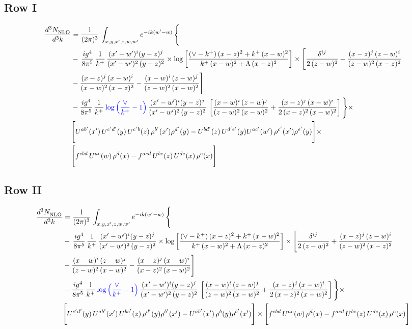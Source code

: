 \documentclass[9pt]{article}
\numberwithin{equation}{section}
\begin{document}
\subsection{Row I}
\begin{align}
     \frac{d^{3}N_{\rm NLO}^{\rm}}{d^{3}k}  & =  \frac{1}{(2\pi)^{3}}\, \int_{x,y,x',z,w,w^{\prime}} e^{-ik(w^{\prime}-w)}\, \Bigg\{\notag \\ & -\,\frac{ig^{4}}{8\pi^{5}}\,\frac{1}{k^{+}}\,\frac{(x'-w')^{i}(y-z)^{j}}{(x'-w')^{2}\,(y-z)^{2}}\times \log{\left[\frac{(\vee-k^{+})\,(x-z)^{2}+k^{+}\,(x-w)^{2}}{k^{+}\,(x-w)^{2}+\Lambda\, (x-z)^{2}}\right]}\times \Bigg[\frac{\delta^{ij}}{2\,(z-w)^{2}}+\frac{(x-z)^{j}\,(z-w)^{i}}{(z-w)^{2}\,(x-z)^{2}}\notag \\ & -\frac{(x-z)^{j}\,(x-w)^{i}}{(x-w)^{2}\,(x-z)^{2}}-\frac{(x-w)^{i}\,(z-w)^{j}}{(z-w)^{2}\,(x-w)^{2}}\Bigg]\notag \\ &  -\frac{ig^{4}}{8\pi^{5}}\,\frac{1}{k^{+}}\,{\color{blue}\log{\left(\frac{\vee}{k^{+}}-1\right)}}\,\frac{(x'-w')^{i}(y-z)^{j}}{(x'-w')^{2}\,(y-z)^{2}}\,\left[\frac{(x-w)^{i}\,(z-w)^{j}}{(z-w)^{2}\,(x-w)^{2}}+\frac{(x-z)^{j}\,(x-w)^{i}}{2\,(x-z)^{2}\, (x-w)^{2}}\right]\Bigg\}\times \notag \\ &  \Bigg[U^{ab'}(x')\,U^{c'd'}(y)\,U^{c'b}(z)\,\rho^{b'}(x')\rho^{d'}(y)-U^{bd'}(z)\,U^{d'e'}(y)U^{ac'}(w')\,\rho^{c'}(x')\rho^{e'}(y)\Bigg]\times\notag \\ & \Bigg[f^{cbd}\,U^{ac}(w)\,\rho^{d}(x)-f^{acd}\, U^{bc}(z)\,U^{de}(x)\,\rho^{e}(x)\Bigg] 
\end{align}
\subsection{Row II}
\begin{align}
     \frac{d^{3}N_{\rm NLO}^{\rm}}{d^{3}k}  & =  \frac{1}{(2\pi)^{3}}\, \int_{x,y,x',z,w,w^{\prime}} e^{-ik(w^{\prime}-w)}\, \Bigg\{\notag \\ & -\,\frac{ig^{4}}{8\pi^{5}}\,\frac{1}{k^{+}}\,\frac{(x'-w')^{i}(y-z)^{j}}{(x'-w')^{2}\,(y-z)^{2}}\times \log{\left[\frac{(\vee-k^{+})\,(x-z)^{2}+k^{+}\,(x-w)^{2}}{k^{+}\,(x-w)^{2}+\Lambda\, (x-z)^{2}}\right]}\times \Bigg[\frac{\delta^{ij}}{2\,(z-w)^{2}}+\frac{(x-z)^{j}\,(z-w)^{i}}{(z-w)^{2}\,(x-z)^{2}}\notag \\ & -\frac{(x-w)^{i}\,(z-w)^{j}}{(z-w)^{2}\,(x-w)^{2}}-\frac{(x-z)^{j}\,(x-w)^{i}}{(x-z)^{2}\,(x-w)^{2}}\Bigg]\notag \\ &  -\frac{ig^{4}}{8\pi^{5}}\,\frac{1}{k^{+}}\,{\color{blue}\log{\left(\frac{\vee}{k^{+}}-1\right)}}\,\frac{(x'-w')^{i}(y-z)^{j}}{(x'-w')^{2}\,(y-z)^{2}}\,\left[\frac{(x-w)^{i}\,(z-w)^{j}}{(z-w)^{2}\,(x-w)^{2}}+\frac{(x-z)^{j}\,(x-w)^{i}}{2\,(x-z)^{2}\, (x-w)^{2}}\right]\Bigg\}\times \notag \\ & \Bigg[U^{c'd'}(y)\,U^{ab'}(x')\,U^{bc'}(z)\,\rho^{d'}(y)\rho^{b'}(x')-U^{ab'}(x')\,\rho^{b}(y)\rho^{b'}(x')\Bigg]\times\Bigg[f^{cbd}\,U^{ac}(w)\,\rho^{d}(x)-f^{acd}\, U^{bc}(z)\,U^{de}(x)\,\rho^{e}(x)\Bigg]
\end{align}
\end{document}
